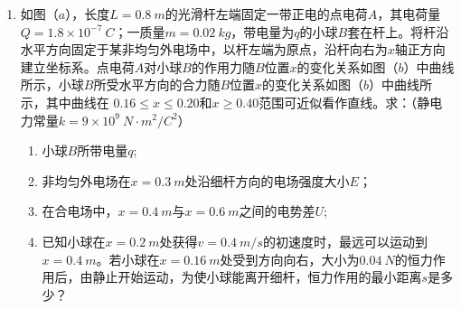 \begin{enumerate}[leftmargin=0em]
\newpage 
\item
{}
如图（$ a $），长度$ L=0.8\ m $的光滑杆左端固定一带正电的点电荷$ A $，其电荷量$ Q=1.8\times 10^{-7}\ C $；一质量$ m=0.02 \ kg $，带电量为$ q $的小球$ B $套在杆上。将杆沿水平方向固定于某非均匀外电场中，以杆左端为原点，沿杆向右为$ x $轴正方向建立坐标系。点电荷$ A $对小球$ B $的作用力随$ B $位置$ x $的变化关系如图（$ b $）中曲线所示，小球$ B $所受水平方向的合力随$ B $位置$ x $的变化关系如图（$ b $）中曲线所示，其中曲线在
$ 0.16 \leq x \leq 0.20 $和$ x \geq 0.40 $范围可近似看作直线。求：（静电力常量$ k=9\times10^{9}\ N\cdot m^{2}/C^{2} $）
\begin{enumerate}
\renewcommand{\labelenumi}{\arabic{enumi}.}
\item
小球$ B $所带电量$ q $;
\item 
非均匀外电场在$ x=0.3\ m $处沿细杆方向的电场强度大小$ E $；
\item 
在合电场中，$ x=0.4\ m $与$ x=0.6\ m $之间的电势差$ U $;
\item 
已知小球在$ x=0.2\ m $处获得$ v=0.4 \ m/s $的初速度时，最远可以运动到$ x=0.4\ m $。若小球在$ x=0.16\ m $处受到方向向右，大小为$ 0.04 \ N $的恒力作用后，由静止开始运动，为使小球能离开细杆，恒力作用的最小距离$ s $是多少？
\end{enumerate}

\begin{figure}[h!]
\flushright
 \qquad 

\end{figure}



\end{enumerate}
